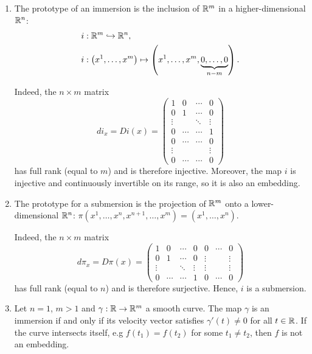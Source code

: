 \begin{example}
  \begin{enumerate}
    \item The prototype of an immersion is the inclusion of $\mathbb{R}^m$ in a higher-dimensional $\mathbb{R}^n$:
    \begin{align}
      i &: \R^m \hookrightarrow \R^n,\\
      i &: \left(x^1, \ldots, x^m\right) \mapsto \left(x^1, \ldots, x^m, \LaTeXunderbrace{0, \ldots, 0}_{n-m}\right).
    \end{align}
    
    Indeed, the $n\times m$ matrix
    \begin{equation}
      di_x = Di(x)
       = \begin{pmatrix}
        1 & 0 & \cdots & 0 \\
        0 & 1 & \cdots & 0 \\
        \vdots & & \ddots & \vdots \\
        0 & \cdots & \cdots & 1 \\
        0 & \cdots & \cdots & 0 \\
        \vdots & & & \vdots \\
        0 & \cdots & \cdots & 0
       \end{pmatrix}
    \end{equation}
    has full rank (equal to $m$) and is therefore injective.
    Moreover, the map $i$ is injective and continuously invertible on its range, so it is also an embedding.

    \item The prototype for a submersion is the projection of $\mathbb{R}^m$ onto a lower-dimensional $\mathbb{R}^n$: $\pi\left(x^1,\ldots,x^n,x^{n+1},\ldots,x^m\right) = \left(x^1,\ldots,x^n\right)$.
    
    Indeed, the $n\times m$ matrix
    \begin{equation}
      d\pi_x = D\pi(x)
       = \begin{pmatrix}
        1 & 0 & \cdots & 0 & 0 & \cdots & 0 \\
        0 & 1 & \cdots & 0 & \vdots & & \vdots \\
        \vdots & & \ddots & \vdots & \vdots & & \vdots \\
        0 & \cdots & \cdots & 1 & 0 & \cdots & 0
       \end{pmatrix}
    \end{equation}
    has full rank (equal to $n$) and is therefore surjective.
    Hence, $i$ is a submersion.

    \item Let $n=1$, $m > 1$ and $\gamma:\mathbb{R}\to\mathbb{R}^m$ a smooth curve.
    The map $\gamma$ is an immersion if and only if its velocity vector satisfies $\gamma'(t)\neq0$ for all $t\in\mathbb{R}$.
    If the curve intersects itself, e.g $f(t_1) = f(t_2)$ for some $t_1\neq t_2$, then $f$ is not an embedding.
  \end{enumerate}
\end{example}

